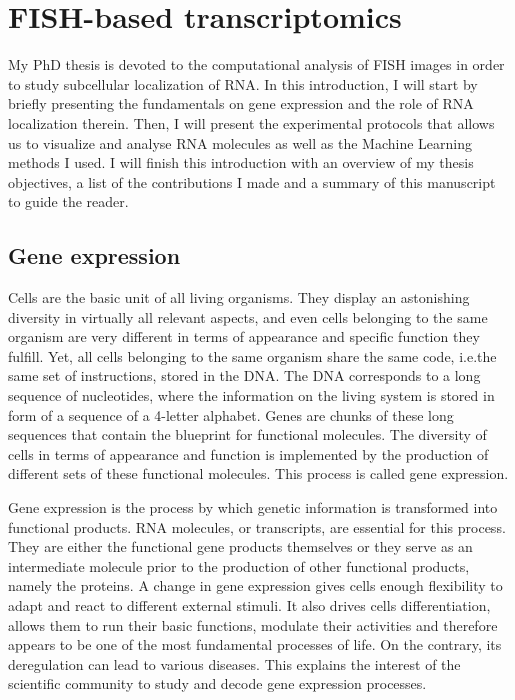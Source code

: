 
\graphicspath{{./figures/introduction/}}

\chapter{FISH-based transcriptomics}
\label{ch:introduction}

\minitoc
\newpage

My PhD thesis is devoted to the computational analysis of \ac{FISH} images in order to study subcellular localization of \ac{RNA}.
In this introduction, I will start by briefly presenting the fundamentals on gene expression and the role of \ac{RNA} localization therein.
Then, I will present the experimental protocols that allows us to visualize and analyse \ac{RNA} molecules as well as the Machine Learning methods I used.
I will finish this introduction with an overview of my thesis objectives, a list of the contributions I made and a summary of this manuscript to guide the reader.

\section{Gene expression}
\label{sec:gene_expression}

Cells are the basic unit of all living organisms.
They display an astonishing diversity in virtually all relevant aspects, and even cells belonging to the same organism are very different in terms of appearance and specific function they fulfill.
Yet, all cells belonging to the same organism share the same code, i.e.\space the same set of instructions, stored in the \ac{DNA}.
The \ac{DNA} corresponds to a long sequence of nucleotides, where the information on the living system is stored in form of a sequence of a 4-letter alphabet.
Genes are chunks of these long sequences that contain the blueprint for functional molecules.
The diversity of cells in terms of appearance and function is implemented by the production of different sets of these functional molecules.
This process is called gene expression.

Gene expression is the process by which genetic information is transformed into functional products.
\ac{RNA} molecules, or transcripts, are essential for this process.
They are either the functional gene products themselves or they serve as an intermediate molecule prior to the production of other functional products, namely the proteins.
A change in gene expression gives cells enough flexibility to adapt and react to different external stimuli.
It also drives cells differentiation, allows them to run their basic functions, modulate their activities and therefore appears to be one of the most fundamental processes of life.
On the contrary, its deregulation can lead to various diseases.
This explains the interest of the scientific community to study and decode gene expression processes.

